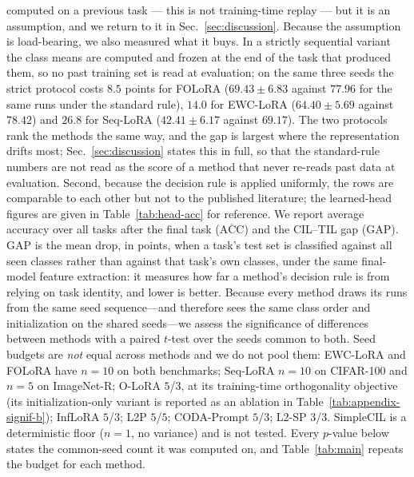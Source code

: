 computed on a previous task --- this is not training-time replay --- but it is an
assumption, and we return to it in Sec.~\ref{sec:discussion}.
Because the assumption is load-bearing, we also measured what it buys. In a strictly
sequential variant the class means are computed and frozen at the end of the task that
produced them, so no past training set is read at evaluation; on the same three seeds the
strict protocol costs $8.5$ points for FOLoRA ($69.43\pm6.83$ against $77.96$ for the same
runs under the standard rule), $14.0$ for EWC-LoRA ($64.40\pm5.69$ against $78.42$) and
$26.8$ for Seq-LoRA ($42.41\pm6.17$ against $69.17$). The two protocols rank the methods
the same way, and the gap is largest where the representation drifts most; Sec.~\ref{sec:discussion}
states this in full, so that the standard-rule numbers are not read as the score of a method
that never re-reads past data at evaluation. Second, because the decision
rule is applied uniformly, the rows are comparable to each other but not to the published
literature; the learned-head figures are given in Table~\ref{tab:head-acc} for reference.
We report average accuracy
over all tasks after the final task ($\overline{\mathrm{ACC}}$) and the CIL--TIL gap
($\mathrm{GAP}$). $\mathrm{GAP}$ is the mean drop, in
points, when a task's test set is classified against all seen classes rather than against
that task's own classes, under the same final-model feature extraction: it measures how
far a method's decision rule is from relying on task identity, and lower is better.
Because every method draws its runs from the same seed sequence---and therefore sees the
same class order and initialization on the shared seeds---we assess the significance of
differences between methods with a paired $t$-test over the seeds common to both. Seed
budgets are \emph{not} equal across methods and we do not pool them: EWC-LoRA and FOLoRA
have $n=10$ on both benchmarks; Seq-LoRA $n=10$ on CIFAR-100 and $n=5$ on ImageNet-R;
O-LoRA $5$/$3$, at its training-time orthogonality objective (its initialization-only
variant is reported as an ablation in Table~\ref{tab:appendix-signif-b}); InfLoRA $5$/$3$;
L2P $5$/$5$; CODA-Prompt $5$/$3$; L2-SP $3$/$3$. SimpleCIL is a deterministic floor
($n=1$, no variance) and is not tested. Every $p$-value below states the common-seed count
it was computed on, and Table~\ref{tab:main} repeats the budget for each method.

